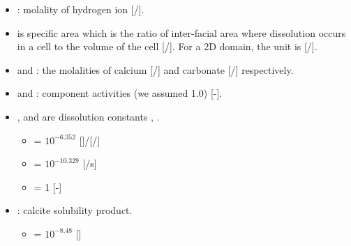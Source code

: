 \begin{itemize}
\item {}: molality of hydrogen ion [/].\\
\item {} is specific area which is the ratio of inter-facial area where dissolution occurs in a cell to the volume of 
the cell [/]. For a 2D domain, the unit is [/]. \\
\item {} and : the molalities of calcium [/] 
and carbonate [/] respectively. \\
\item {} and : component activities (we assumed 1.0) [-].\\
\item {},  and  are dissolution constants \cite{chou1989comparative}, \cite{compton1989dissolution}. \\
\begin{itemize}
    \item {} = $10^{-6.352}$ []/[/]\\
    \item {} = $10^{-10.329}$ [/s]\\
    \item {} = 1 [-] \\
\end{itemize}
\item {}: calcite solubility product.\\
\begin{itemize}
    \item {} = $10^{-8.48}$ []\\
\end{itemize}
\end{itemize}




